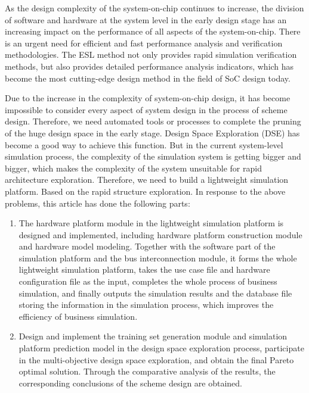 \begin{abstract*}
  As the design complexity of the system-on-chip continues to increase, the division of software and hardware at 
  the system level in the early design stage has an increasing impact on the performance of all aspects of the 
  system-on-chip. There is an urgent need for efficient and fast performance analysis and verification methodologies. 
  The ESL method not only provides rapid simulation verification methods, but also provides detailed performance analysis 
  indicators, which has become the most cutting-edge design method in the field of SoC design today.


  Due to the increase in the complexity of system-on-chip design, it has become impossible to consider every aspect of system 
  design in the process of scheme design. Therefore, we need automated tools or processes to complete the pruning of the huge 
  design space in the early stage. Design Space Exploration (DSE) has become a good way to achieve this function. But in the 
  current system-level simulation process, the complexity of the simulation system is getting bigger and bigger, which makes 
  the complexity of the system unsuitable for rapid architecture exploration. Therefore, we need to build a lightweight simulation 
  platform. Based on the rapid structure exploration. In response to the above problems, this article has done the following parts:

  \begin{enumerate}
    \item The hardware platform module in the lightweight simulation platform is designed and implemented, including hardware platform construction module and hardware model modeling. Together with the software part of the simulation platform and the bus interconnection module, it forms the whole lightweight simulation platform, takes the use case file and hardware configuration file as the input, completes the whole process of business simulation, and finally outputs the simulation results and the database file storing the information in the simulation process, which improves the efficiency of business simulation.
    \item Design and implement the training set generation module and simulation platform prediction model in the design space exploration process, participate in the multi-objective design space exploration, and obtain the final Pareto optimal solution. Through the comparative analysis of the results, the corresponding conclusions of the scheme design are obtained.
  \end{enumerate}


\end{abstract*}
